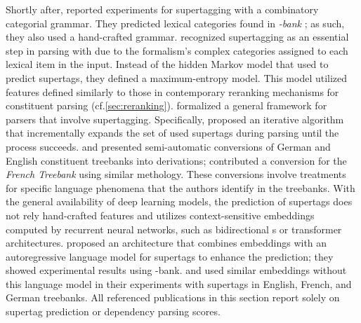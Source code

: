 \documentclass[../document.tex]{subfiles}
\begin{document}
    Shortly after, \citet{clark2002supertagging} reported experiments for supertagging with a combinatory categorial grammar.
    They predicted lexical categories found in \emph{-bank} \citep{Hoc07}; as such, they also used a hand-crafted grammar.
     recognized supertagging as an essential step in parsing with  due to the formalism's complex categories assigned to each lexical item in the input.
    Instead of the hidden Markov model that \citeauthor{bangalore1999supertagging} used to predict supertags, they defined a maximum-entropy model.
    This model utilized features defined similarly to those in contemporary reranking mechanisms for constituent parsing (cf.\@ \cref{sec:reranking}).
     formalized a general framework for parsers that involve supertagging.
    Specifically, \citeauthor{Auli12} proposed an iterative algorithm that incrementally expands the set of used supertags during parsing until the process succeeds.
     and \citet{Kaeshammer2012GermanAE} presented semi-automatic conversions of German and English constituent treebanks into  derivations; \citet{Bla18} contributed a conversion for the \emph{French Treebank} \citep{abeille2003building} using similar methology.
    These conversions involve treatments for specific language phenomena that the authors identify in the treebanks.
    With the general availability of deep learning models, the prediction of supertags does not rely hand-crafted features and utilizes context-sensitive embeddings computed by recurrent neural networks, such as bidirectional s or transformer architectures.
     proposed an architecture that combines  embeddings with an autoregressive language model for supertags to enhance the prediction; they showed experimental results using -bank.
     and \citet{Bla18} used similar embeddings without this language model in their experiments with  supertags in English, French, and German treebanks.
    All referenced publications in this section report solely on supertag prediction or dependency parsing scores.

    \ifSubfilesClassLoaded{%
        \printindex
    }{}
\end{document}
